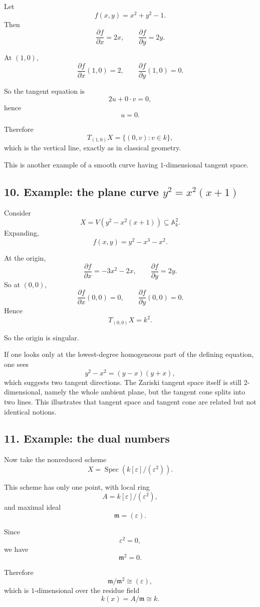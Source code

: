 \documentclass[12pt,a4paper]{article}
\theoremstyle{plain}
\theoremstyle{definition}      %
\begin{document}
	Let
	\[
	f(x,y)=x^2+y^2-1.
	\]
	Then
	\[
	\frac{\partial f}{\partial x}=2x,
	\qquad
	\frac{\partial f}{\partial y}=2y.
	\]
	
	At \((1,0)\),
	\[
	\frac{\partial f}{\partial x}(1,0)=2,
	\qquad
	\frac{\partial f}{\partial y}(1,0)=0.
	\]
	
	So the tangent equation is
	\[
	2u+0\cdot v=0,
	\]
	hence
	\[
	u=0.
	\]
	
	Therefore
	\[
	T_{(1,0)}X=\{(0,v):v\in k\},
	\]
	which is the vertical line, exactly as in classical geometry.
	
	This is another example of a smooth curve having \(1\)-dimensional tangent space.
	
	\subsection*{10. Example: the plane curve \(y^2=x^2(x+1)\)}
	
	Consider
	\[
	X=V(y^2-x^2(x+1))\subseteq \mathbb A_k^2.
	\]
	Expanding,
	\[
	f(x,y)=y^2-x^3-x^2.
	\]
	
	At the origin,
	\[
	\frac{\partial f}{\partial x}=-3x^2-2x,
	\qquad
	\frac{\partial f}{\partial y}=2y.
	\]
	So at \((0,0)\),
	\[
	\frac{\partial f}{\partial x}(0,0)=0,
	\qquad
	\frac{\partial f}{\partial y}(0,0)=0.
	\]
	Hence
	\[
	T_{(0,0)}X=k^2.
	\]
	
	So the origin is singular.
	
	If one looks only at the lowest-degree homogeneous part of the defining equation, one sees
	\[
	y^2-x^2=(y-x)(y+x),
	\]
	which suggests two tangent directions. The Zariski tangent space itself is still \(2\)-dimensional, namely the whole ambient plane, but the tangent cone splits into two lines. This illustrates that tangent space and tangent cone are related but not identical notions.
	
	\subsection*{11. Example: the dual numbers}
	
	Now take the nonreduced scheme
	\[
	X=\operatorname{Spec}(k[\varepsilon]/(\varepsilon^2)).
	\]
	
	This scheme has only one point, with local ring
	\[
	A=k[\varepsilon]/(\varepsilon^2),
	\]
	and maximal ideal
	\[
	\mathfrak m=(\varepsilon).
	\]
	
	Since
	\[
	\varepsilon^2=0,
	\]
	we have
	\[
	\mathfrak m^2=0.
	\]
	
	Therefore
	\[
	\mathfrak m/\mathfrak m^2\cong (\varepsilon),
	\]
	which is \(1\)-dimensional over the residue field
	\[
	k(x)=A/\mathfrak m\cong k.
	\]
	
\end{document}
